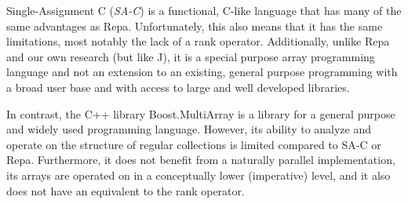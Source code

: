 Single-Assignment C (\textit{SA-C}) is a functional, C-like language 
that has many of the same advantages as Repa\cite{dph}\cite{sac}.
Unfortunately, this also means that it has the same limitations, most notably the lack of a rank operator.
Additionally, unlike Repa and our own research (but like J), 
it is a special purpose array programming language and 
not an extension to an existing, general purpose programming with a broad user base and 
with access to large and well developed libraries.

In contrast, the C++ library Boost.MultiArray is a library for a general purpose and widely used programming language\cite{boost}.
However, its ability to analyze and operate on the structure of regular collections is limited compared to SA-C or Repa.
Furthermore, it does not benefit from a naturally parallel implementation, 
its arrays are operated on in a conceptually lower (imperative) level, 
and it also does not have an equivalent to the rank operator. 
